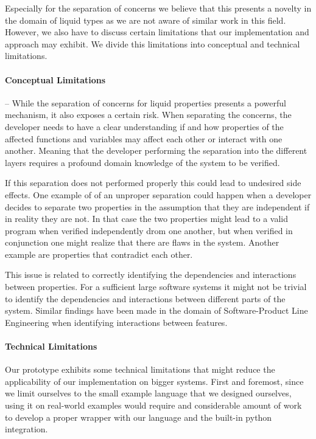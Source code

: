 Especially for the separation of concerns we believe that this presents a novelty in the domain of liquid types as we are not aware of similar work in this field. However, we also have to discuss certain limitations that our implementation and approach may exhibit. We divide this limitations into conceptual and technical limitations.

\paragraph{Conceptual Limitations} -- While the separation of concerns for liquid properties presents a powerful mechanism, it also exposes a certain risk. When separating the concerns, the developer needs to have a clear understanding if and how properties of the affected functions and variables may affect each other or interact with one another. Meaning that the developer performing the separation into the different layers requires a profound domain knowledge of the system to be verified.

If this separation does not performed properly this could lead to undesired side effects. One example of of an unproper separation could happen when a developer decides to separate two properties in the assumption that they are independent if in reality they are not. In that case the two properties might lead to a valid program when verified independently drom one another, but when verified in conjunction one might realize that there are flaws in the system. Another example are properties that contradict each other.

This issue is related to correctly identifying the dependencies and interactions between properties. For a sufficient large software systems it might not be trivial to identify the dependencies and interactions between different parts of the system. Similar findings have been made in the domain of Software-Product Line Engineering when identifying interactions between features\cite{apel2013}.

\paragraph{Technical Limitations} Our prototype exhibits some technical limitations that might reduce the applicability of our implementation on bigger systems. First and foremost, since we limit ourselves to the small example language that we designed ourselves, using it on real-world examples would require and considerable amount of work to develop a proper wrapper with our language and the built-in python integration.

